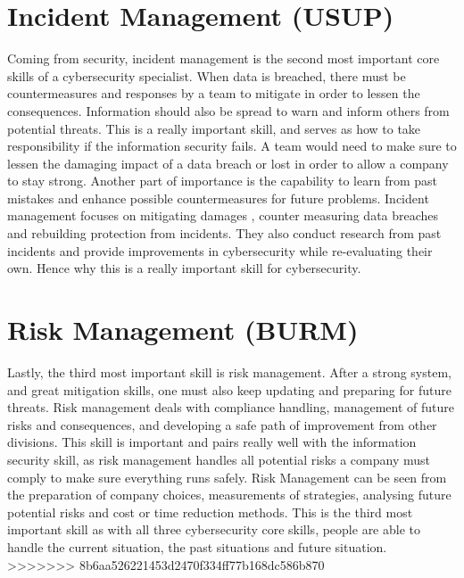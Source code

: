 \documentclass[a4paper, 11pt]{report}
\begin{document}
\section*{\textbf{Incident Management (USUP)}}

Coming from security, incident management is the second most important core skills of a cybersecurity specialist. When data is breached, there must be countermeasures and responses by a team to mitigate in order to lessen the consequences. Information should also be spread to warn and inform others from potential threats. This is a really important skill, and serves as how to take responsibility if the information security fails. A team would need to make sure to lessen the damaging impact of a data breach or lost in order to allow a company to stay strong. Another part of importance is the capability to learn from past mistakes and enhance possible countermeasures for future problems. Incident management focuses on mitigating damages , counter measuring data breaches and rebuilding protection from incidents. They also conduct research from past incidents and provide improvements in cybersecurity while re-evaluating their own. Hence why this is a really important skill for cybersecurity.\\

\section*{\textbf{Risk Management (BURM)}}

Lastly, the third most important skill is risk management. After a strong system, and great mitigation skills, one must also keep updating and preparing for future threats. Risk management deals with compliance handling, management of future risks and consequences, and developing a safe path of improvement from other divisions.  This skill is important and pairs really well with the information security skill, as risk management handles all potential risks a company must comply to make sure everything runs safely. Risk Management can be seen from the preparation of company choices, measurements of strategies, analysing future potential risks and cost or time reduction methods. This is the third most important skill as with all three cybersecurity core skills, people are able to handle the current situation, the past situations and future situation.\\
>>>>>>> 8b6aa526221453d2470f334ff77b168dc586b870

\end{document}
